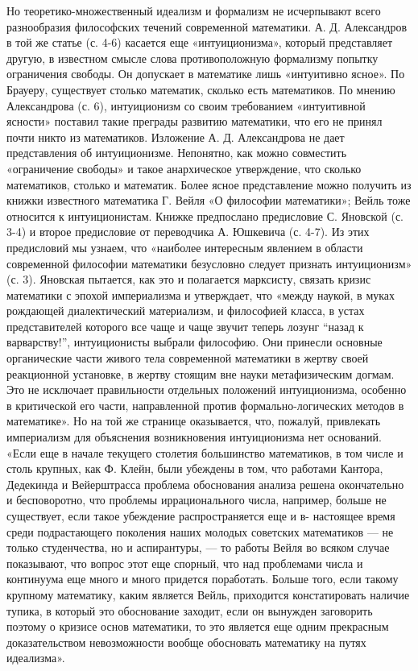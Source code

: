 Но теоретико-множественный идеализм и формализм не исчерпывают
всего разнообразия философских течений современной математики. А. Д.
Александров в той же статье (с. 4-6) касается еще «интуиционизма»,
который представляет другую, в известном смысле слова противоположную
формализму попытку ограничения свободы. Он допускает в математике лишь
«интуитивно ясное». По Брауеру, существует столько математик, сколько
есть математиков. По мнению Александрова (с. 6), интуиционизм со своим
требованием «интуитивной ясности» поставил такие преграды развитию
математики, что его не принял почти никто из математиков. Изложение А.
Д. Александрова не дает представления об интуиционизме. Непонятно, как
можно совместить «ограничение свободы» и такое анархическое
утверждение, что сколько математиков, столько и математик. Более ясное
представление можно получить из книжки известного математика Г. Вейля
«О философии математики»; Вейль тоже относится к интуиционистам.
Книжке предпослано предисловие С. Яновской (с. 3-4) и второе
предисловие от переводчика А. Юшкевича (с. 4-7). Из этих предисловий
мы узнаем, что «наиболее интересным явлением в области современной
философии математики безусловно следует признать интуиционизм» (с. 3).
Яновская пытается, как это и полагается марксисту, связать кризис
математики с эпохой империализма и утверждает, что «между наукой, в
муках рождающей диалектический материализм, и философией класса, в
устах представителей которого все чаще и чаще звучит теперь лозунг
``назад к варварству!'', интуиционисты выбрали философию. Они принесли
основные органические части живого тела современной математики в
жертву своей реакционной установке, в жертву стоящим вне науки
метафизическим догмам. Это не исключает правильности отдельных
положений интуиционизма, особенно в критической его части,
направленной против формально-логических методов в математике». Но на
той же странице оказывается, что, пожалуй, привлекать империализм для
объяснения возникновения интуиционизма нет оснований. «Если еще в
начале текущего столетия большинство математиков, в том числе и столь
крупных, как Ф. Клейн, были убеждены в том, что работами Кантора,
Дедекинда и Вейерштрасса проблема обоснования анализа решена
окончательно и бесповоротно, что проблемы иррационального числа,
например, больше не существует, если такое убеждение распространяется
еще и в- настоящее время среди подрастающего поколения наших молодых
советских математиков --- не только студенчества, но и аспирантуры,
--- то работы Вейля во всяком случае показывают, что вопрос этот еще
спорный, что над проблемами числа и континуума еще много и много
придется поработать. Больше того, если такому крупному математику,
каким является Вейль, приходится констатировать наличие тупика, в
который это обоснование заходит, если он вынужден заговорить поэтому о
кризисе основ математики, то это является еще одним прекрасным
доказательством невозможности вообще обосновать математику на путях
идеализма».


